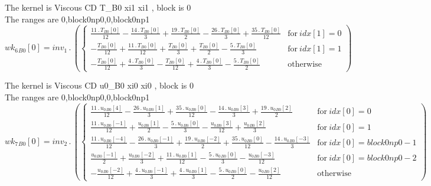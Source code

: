 \documentclass{article}
\begin{document}
\noindent The kernel is Viscous CD T_B0 xi1 xi1 , block is 0\\\noindent The ranges are 0,block0np0,0,block0np1\\\begin{dmath}{wk_{6}{_{B0}}}[{0}] = inv_1 \,.\, \left(\begin{cases} \frac{11 \,.\, {T{_{B0}}}[{0}]}{12} - \frac{14 \,.\, {T{_{B0}}}[{0}]}{3} + \frac{19 \,.\, {T{_{B0}}}[{0}]}{2} - \frac{26 \,.\, {T{_{B0}}}[{0}]}{3} + \frac{35 \,.\, 
{T{_{B0}}}[{0}]}{12} & \text{for}\: {idx}[{1}] = 0 \\- \frac{{T{_{B0}}}[{0}]}{12} + \frac{11 \,.\, {T{_{B0}}}[{0}]}{12} + \frac{{T{_{B0}}}[{0}]}{3} + \frac{{T{_{B0}}}[{0}]}{2} - \frac{5 \,.\, {T{_{B0}}}[{0}]}{3} & \text{for}\: {idx}[{1}] = 1 \\- 
\frac{{T{_{B0}}}[{0}]}{12} + \frac{4 \,.\, {T{_{B0}}}[{0}]}{3} - \frac{{T{_{B0}}}[{0}]}{12} + \frac{4 \,.\, {T{_{B0}}}[{0}]}{3} - \frac{5 \,.\, {T{_{B0}}}[{0}]}{2} & \text{otherwise} \end{cases}\right)\end{dmath}

\noindent The kernel is Viscous CD u0_B0 xi0 xi0 , block is 0\\\noindent The ranges are 0,block0np0,0,block0np1\\\begin{dmath}{wk_{7}{_{B0}}}[{0}] = inv_2 \,.\, \left(\begin{cases} \frac{11 \,.\, {u_{0}{_{B0}}}[{4}]}{12} - \frac{26 \,.\, {u_{0}{_{B0}}}[{1}]}{3} + \frac{35 \,.\, {u_{0}{_{B0}}}[{0}]}{12} - \frac{14 \,.\, {u_{0}{_{B0}}}[{3}]}{3} + \frac{19 \,.\, 
{u_{0}{_{B0}}}[{2}]}{2} & \text{for}\: {idx}[{0}] = 0 \\\frac{11 \,.\, {u_{0}{_{B0}}}[{-1}]}{12} + \frac{{u_{0}{_{B0}}}[{1}]}{2} - \frac{5 \,.\, {u_{0}{_{B0}}}[{0}]}{3} - \frac{{u_{0}{_{B0}}}[{3}]}{12} + \frac{{u_{0}{_{B0}}}[{2}]}{3} & \text{for}\: 
{idx}[{0}] = 1 \\\frac{11 \,.\, {u_{0}{_{B0}}}[{-4}]}{12} - \frac{26 \,.\, {u_{0}{_{B0}}}[{-1}]}{3} + \frac{19 \,.\, {u_{0}{_{B0}}}[{-2}]}{2} + \frac{35 \,.\, {u_{0}{_{B0}}}[{0}]}{12} - \frac{14 \,.\, {u_{0}{_{B0}}}[{-3}]}{3} & \text{for}\: 
{idx}[{0}] = block0np0 - 1 \\\frac{{u_{0}{_{B0}}}[{-1}]}{2} + \frac{{u_{0}{_{B0}}}[{-2}]}{3} + \frac{11 \,.\, {u_{0}{_{B0}}}[{1}]}{12} - \frac{5 \,.\, {u_{0}{_{B0}}}[{0}]}{3} - \frac{{u_{0}{_{B0}}}[{-3}]}{12} & \text{for}\: {idx}[{0}] = block0np0 - 2 
\\- \frac{{u_{0}{_{B0}}}[{-2}]}{12} + \frac{4 \,.\, {u_{0}{_{B0}}}[{-1}]}{3} + \frac{4 \,.\, {u_{0}{_{B0}}}[{1}]}{3} - \frac{5 \,.\, {u_{0}{_{B0}}}[{0}]}{2} - \frac{{u_{0}{_{B0}}}[{2}]}{12} & \text{otherwise} \end{cases}\right)\end{dmath}
\end{document}
